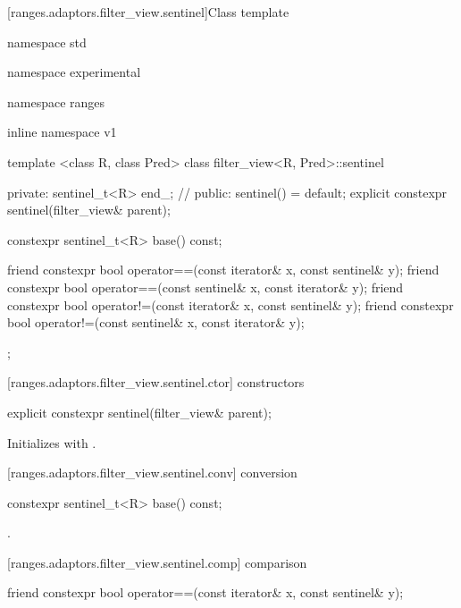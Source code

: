 [ranges.adaptors.filter_view.sentinel]{Class template }

%
\begin{codeblock}
namespace std { namespace experimental { namespace ranges { inline namespace v1 {
  template <class R, class Pred>
  class filter_view<R, Pred>::sentinel {
  private:
    sentinel_t<R> end_; // \expos
  public:
    sentinel() = default;
    explicit constexpr sentinel(filter_view& parent);

    constexpr sentinel_t<R> base() const;

    friend constexpr bool operator==(const iterator& x, const sentinel& y);
    friend constexpr bool operator==(const sentinel& x, const iterator& y);
    friend constexpr bool operator!=(const iterator& x, const sentinel& y);
    friend constexpr bool operator!=(const sentinel& x, const iterator& y);
  };
}}}}
\end{codeblock}

[ranges.adaptors.filter_view.sentinel.ctor]{ constructors}

%
\begin{itemdecl}
explicit constexpr sentinel(filter_view& parent);
\end{itemdecl}

\begin{itemdescr}
\pnum
\effects Initializes  with .
\end{itemdescr}

[ranges.adaptors.filter_view.sentinel.conv]{ conversion}

%
\begin{itemdecl}
constexpr sentinel_t<R> base() const;
\end{itemdecl}

\begin{itemdescr}
\pnum
\returns {}.
\end{itemdescr}

[ranges.adaptors.filter_view.sentinel.comp]{ comparison}

%
\begin{itemdecl}
friend constexpr bool operator==(const iterator& x, const sentinel& y);
\end{itemdecl}

